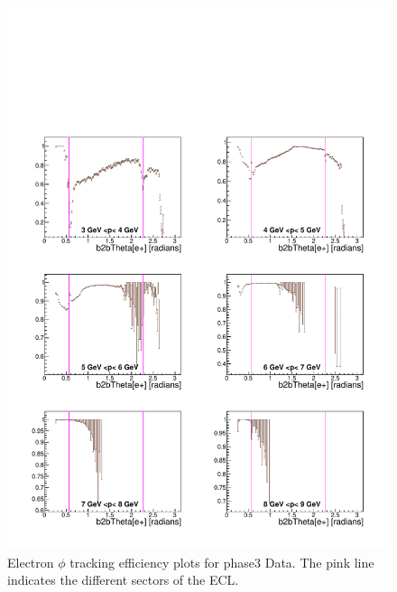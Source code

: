 \documentclass[a4paper,11pt,twosided,final,german,openbib,pdftex,listof=totoc,bibliography=totoc]{scrbook}
\begin{document}
\begin{appendix}
\begin{figure}[!htbp]
	\centering
	\includegraphics[width=\textwidth]{Plots/master3/xPMThetaem_DataP3}
	\caption[Momentum $\theta$ Electron Efficiency Phase3 Data]{Electron $\phi$ tracking efficiency plots for phase3 Data. The pink line indicates the different sectors of the ECL.}
	\label{plt:PMThetaem3_Data}
\end{figure}



\end{appendix}
\end{document}
